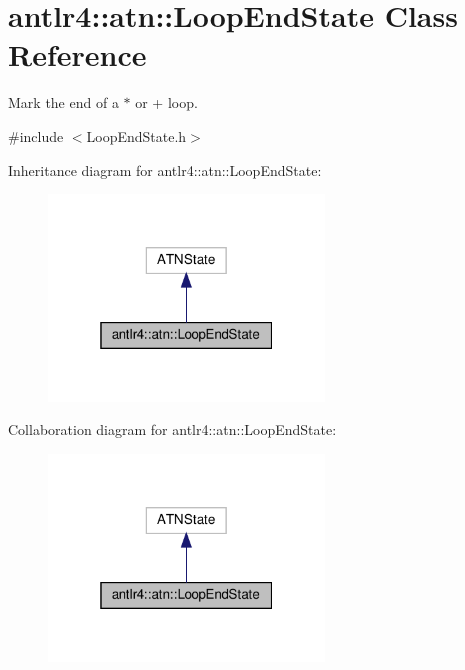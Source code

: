 \hypertarget{classantlr4_1_1atn_1_1LoopEndState}{}\section{antlr4\+:\+:atn\+:\+:Loop\+End\+State Class Reference}
\label{classantlr4_1_1atn_1_1LoopEndState}


Mark the end of a $\ast$ or + loop.  




{\ttfamily \#include $<$Loop\+End\+State.\+h$>$}



Inheritance diagram for antlr4\+:\+:atn\+:\+:Loop\+End\+State\+:
\nopagebreak
\begin{figure}[H]
\begin{center}
\leavevmode
\includegraphics[width=208pt]{classantlr4_1_1atn_1_1LoopEndState__inherit__graph}
\end{center}
\end{figure}


Collaboration diagram for antlr4\+:\+:atn\+:\+:Loop\+End\+State\+:
\nopagebreak
\begin{figure}[H]
\begin{center}
\leavevmode
\includegraphics[width=208pt]{classantlr4_1_1atn_1_1LoopEndState__coll__graph}
\end{center}
\end{figure}

